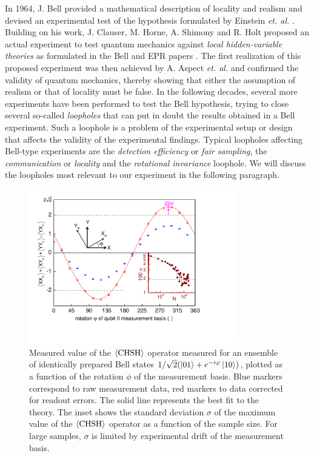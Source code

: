 \smallskip

In 1964, J. Bell provided a mathematical description of locality and realism and devised an experimental test of the hypothesis formulated by Einstein {\it et. al.} \citep{bell_einstein_1964}. Building on his work, J. Clauser, M. Horne, A. Shimony and R. Holt proposed an actual experiment to test quantum mechanics against {\it local hidden-variable theories} as formulated in the Bell and EPR papers \cite{clauser_proposed_1969}. The first realization of this proposed experiment was then achieved by A. Aspect {\it et. al.} \cite{aspect_experimental_1982} and confirmed the validity of quantum mechanics, thereby showing that either the assumption of realism or that of locality must be false. In the following decades, several more experiments have been performed to test the Bell hypothesis, trying to close several so-called {\it loopholes} that can put in doubt the results obtained in a Bell experiment. Such a loophole is a problem of the experimental setup or design that affects the validity of the experimental findings. Typical loopholes affecting Bell-type experiments are the {\it detection efficiency} or {\it fair sampling}, the {\it communication} or {\it locality} and the {\it rotational invariance} loophole. We will discuss the loopholes most relevant to our experiment in the following paragraph.

\smallskip

\begin{figure}[ht!]
	\centering
		\includegraphics[width=0.8\textwidth]{./material/papers/iswap/figures/chsh}
	\caption[]{Measured value of the $\left< \mathrm{CHSH} \right>$ operator measured for an ensemble of identically prepared Bell states $1/\sqrt{2}(\left| 01 \right>+e^{-i\varphi}\left| 10 \right>)$, plotted as a function of the rotation $\phi$ of the measurement basis. Blue markers correspond to raw measurement data, red markers to data corrected for readout errors. The solid line represents the best fit to the theory. The inset shows the standard deviation $\sigma$ of the maximum value of the $\left< \mathrm{CHSH} \right>$ operator as a function of the sample size. For large samples, $\sigma$ is limited by experimental drift of the measurement basis.}
	\label{fig:chsh}
\end{figure}

